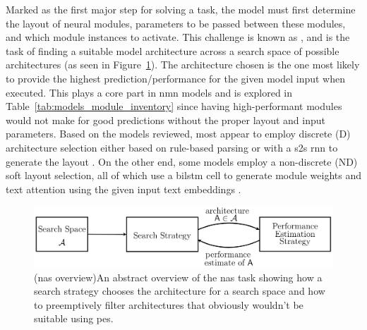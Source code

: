 Marked as the first major step for solving a task, the model must first determine the layout of neural modules, parameters to be passed between these modules, and which module instances to activate.
This challenge is known as , and is the task of finding a suitable model architecture across a search space of possible architectures (as seen in Figure~\ref{fig:neural_architecture_search_overview})\cite{elsken_neural_2019}.
The architecture chosen is the one most likely to provide the highest prediction/performance for the given model input when executed.
This plays a core part in \gls{nmn} models and is explored in Table~\ref{tab:models_module_inventory} since having high-performant modules would not make for good predictions without the proper layout and input parameters.
Based on the models reviewed, most appear to employ discrete (D) architecture selection either based on rule-based parsing \cite{andreas_neural_2016,chen_meta_2020} or with a \gls{s2s} \gls{rnn} to generate the layout \cite{hu_learning_2017,chen_teaching_2022,su_toward_2020,kottur_visual_2018,cho_visual_2021}.
On the other end, some models employ a non-discrete (ND) soft layout selection, all of which use a \gls{bilstm} cell to generate module weights and text attention using the given input text embeddings \cite{hu_explainable_2019,hudson_compositional_2018,pahuja_learning_2019}.

\begin{figure}[htbp]
    \centering
    \includegraphics[width=\textwidth,keepaspectratio]{content/chapters/literature_review/discussion/figures/neural_architecture_search_overview.png}
    \captionsource(\acrshort{nas} overview){An abstract overview of the \acrshort{nas} task showing how a search strategy chooses the architecture for a search space and how to preemptively filter architectures that obviously wouldn't be suitable using \acrshort{pes}.\label{fig:neural_architecture_search_overview}}{\citeauthor{elsken_neural_2019}\cite{elsken_neural_2019}}
\end{figure}

